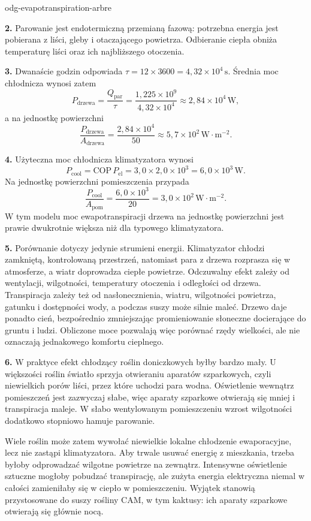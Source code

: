 \begin{exo}{odg-evapotranspiration-arbre}
\begin{solution}
\textbf{2.} Parowanie jest endotermiczną przemianą fazową: potrzebna energia jest pobierana z liści, gleby i otaczającego powietrza. Odbieranie ciepła obniża temperaturę liści oraz ich najbliższego otoczenia.

\textbf{3.} Dwanaście godzin odpowiada $\tau=12\times3600=4{,}32\times10^4\,\text{s}$. Średnia moc chłodnicza wynosi zatem
\[
P_{\text{drzewa}}=\frac{Q_{\mathrm{par}}}{\tau}
=\frac{1{,}225\times10^9}{4{,}32\times10^4}
\approx2{,}84\times10^4\,\text{W},
\]
a na jednostkę powierzchni
\[
\frac{P_{\text{drzewa}}}{A_{\text{drzewa}}}
=\frac{2{,}84\times10^4}{50}
\approx5{,}7\times10^2\,\text{W}\!\cdot\!\text{m}^{-2}.
\]

\textbf{4.} Użyteczna moc chłodnicza klimatyzatora wynosi
\[
P_{\text{cool}}=\mathrm{COP}\,P_{\mathrm{el}}
=3{,}0\times2{,}0\times10^3
=6{,}0\times10^3\,\text{W}.
\]
Na jednostkę powierzchni pomieszczenia przypada
\[
\frac{P_{\text{cool}}}{A_{\text{pom}}}
=\frac{6{,}0\times10^3}{20}
=3{,}0\times10^2\,\text{W}\!\cdot\!\text{m}^{-2}.
\]
W tym modelu moc ewapotranspiracji drzewa na jednostkę powierzchni jest prawie dwukrotnie większa niż dla typowego klimatyzatora.

\textbf{5.} Porównanie dotyczy jedynie strumieni energii. Klimatyzator chłodzi zamkniętą, kontrolowaną przestrzeń, natomiast para z drzewa rozprasza się w atmosferze, a wiatr doprowadza ciepłe powietrze. Odczuwalny efekt zależy od wentylacji, wilgotności, temperatury otoczenia i odległości od drzewa. Transpiracja zależy też od nasłonecznienia, wiatru, wilgotności powietrza, gatunku i dostępności wody, a podczas suszy może silnie maleć. Drzewo daje ponadto cień, bezpośrednio zmniejszając promieniowanie słoneczne docierające do gruntu i ludzi. Obliczone moce pozwalają więc porównać rzędy wielkości, ale nie oznaczają jednakowego komfortu cieplnego.

\textbf{6.} W praktyce efekt chłodzący roślin doniczkowych byłby bardzo mały. U większości roślin światło sprzyja otwieraniu aparatów szparkowych, czyli niewielkich porów liści, przez które uchodzi para wodna. Oświetlenie wewnątrz pomieszczeń jest zazwyczaj słabe, więc aparaty szparkowe otwierają się mniej i transpiracja maleje. W słabo wentylowanym pomieszczeniu wzrost wilgotności dodatkowo stopniowo hamuje parowanie.

Wiele roślin może zatem wywołać niewielkie lokalne chłodzenie ewaporacyjne, lecz nie zastąpi klimatyzatora. Aby trwale usuwać energię z mieszkania, trzeba byłoby odprowadzać wilgotne powietrze na zewnątrz. Intensywne oświetlenie sztuczne mogłoby pobudzać transpirację, ale zużyta energia elektryczna niemal w całości zamieniłaby się w ciepło w pomieszczeniu. Wyjątek stanowią przystosowane do suszy rośliny CAM, w tym kaktusy: ich aparaty szparkowe otwierają się głównie nocą.
\end{solution}
\end{exo}

